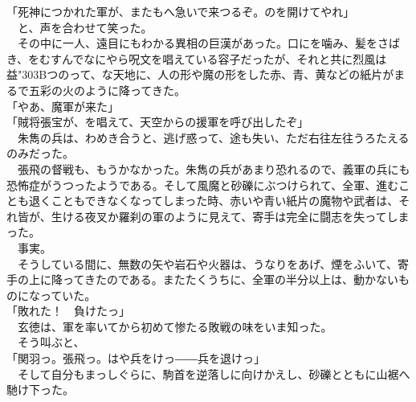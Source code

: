 \documentclass[
  paper=a5,
  fontsize=10pt,
  jafontsize=9.5pt,
  tate,                  %
  open_bracket_pos=nibu, %
]{jlreq}
\begin{document}
「死神につかれた軍が、またもへ急いで来つるぞ。のを開けてやれ」\\


　と、声を合わせて笑った。\\


　その中に一人、遠目にもわかる異相の巨漢があった。口にを噛み、髪をさばき、をむすんでなにやら呪文を唱えている容子だったが、それと共に烈風は益{\char"303B}つのって、な天地に、人の形や魔の形をした赤、青、黄などの紙片がまるで五彩の火のように降ってきた。\\


「やあ、魔軍が来た」\\


「賊将張宝が、を唱えて、天空からの援軍を呼び出したぞ」\\


　朱雋の兵は、わめき合うと、逃げ惑って、途も失い、ただ右往左往うろたえるのみだった。\\


　張飛の督戦も、もうかなかった。朱雋の兵があまり恐れるので、義軍の兵にも恐怖症がうつったようである。そして風魔と砂礫にぶつけられて、全軍、進むことも退くこともできなくなってしまった時、赤いや青い紙片の魔物や武者は、それ皆が、生ける夜叉か羅刹の軍のように見えて、寄手は完全に闘志を失ってしまった。\\


　事実。\\


　そうしている間に、無数の矢や岩石や火器は、うなりをあげ、煙をふいて、寄手の上に降ってきたのである。またたくうちに、全軍の半分以上は、動かないものになっていた。\\


「敗れた！　負けたっ」\\


　玄徳は、軍を率いてから初めて惨たる敗戦の味をいま知った。\\


　そう叫ぶと、\\


「関羽っ。張飛っ。はや兵をけっ――兵を退けっ」\\


　そして自分もまっしぐらに、駒首を逆落しに向けかえし、砂礫とともに山裾へ馳け下った。\\

\\
\end{document}
